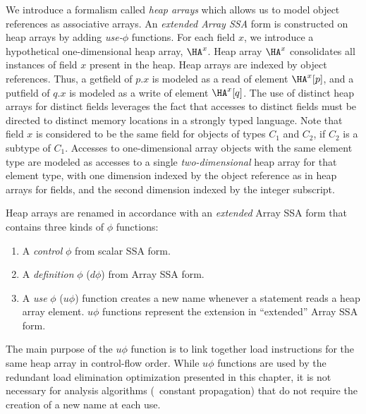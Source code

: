 We introduce a
formalism called {\em heap arrays} which allows us to model
object references as associative arrays.   
An {\em extended Array SSA} form is constructed on heap arrays by
adding
{\em use-$\phi$} functions.
For each field $x$, we introduce
a hypothetical one-dimensional
heap array,  $\HA^x$.
Heap array $\HA^x$ consolidates all instances of field
$x$ present in the heap.
Heap arrays are indexed by object references.
Thus, a {\sc getfield}
of $p.x$ is modeled as a read of element $\HA^x[p]$,
and a {\sc putfield} of $q.x$ is modeled as a write of element $\HA^x[q]$.
The use of distinct heap arrays for distinct fields leverages the 
fact that accesses to distinct fields must be directed to 
distinct memory locations in a strongly typed language.
Note that field $x$ is considered to be the same field for objects of types
$C_1$ and $C_2$, if $C_2$ is
a subtype of $C_1$.
Accesses to one-dimensional array objects with the same element type
are modeled as accesses to a single {\it two-dimensional} heap
array for that element type, with one dimension indexed by
the object reference as in heap arrays for fields, and the second
dimension indexed by the integer subscript. 


Heap arrays are renamed in accordance with 
an {\it extended}
Array SSA form that contains three kinds of $\phi$ functions:
\begin{enumerate}
\item 
A {\em control} $\phi$ from scalar SSA form.
\item
A {\em definition} $\phi$ ($d\phi$) from Array SSA form.
\item
A {\em use} $\phi$ ($u\phi$) function creates
a new name whenever a statement reads a heap array element.
$u\phi$ functions represent the extension
in ``extended'' Array SSA form.
\end{enumerate}
The main purpose of the $u\phi$ function is to link
together load instructions for the same heap array in control-flow order.   While $u\phi$ functions are used by the redundant load
elimination optimization presented in this chapter, it is not
necessary for analysis algorithms (\eg\ constant propagation) that do not require the creation of
a 
new name at each use.
